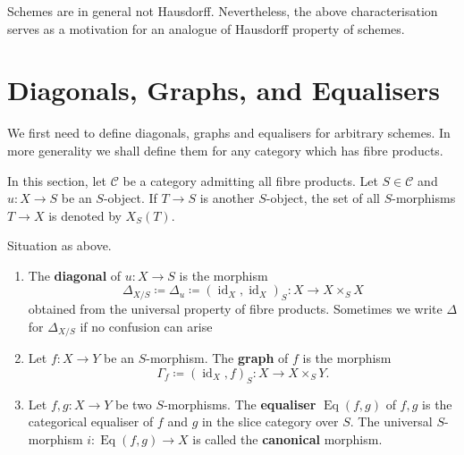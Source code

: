 \documentclass[12pt]{book}
\newcommand{\inlinedef}[1]{\textcolor{oxfordblue}{\bfseries #1}}
\theoremstyle{definition}
\newcommand{\id}{\operatorname{id}}
\newcommand{\Eqlsr}{\operatorname{Eq}}
\begin{document}
	Schemes are in general not Hausdorff. Nevertheless, the above characterisation serves as a motivation for an analogue of Hausdorff property of schemes.
	
	\section{Diagonals, Graphs, and Equalisers}
	
	We first need to define diagonals, graphs and equalisers for arbitrary schemes. In more generality we shall define them for any category which has fibre products.
	
	In this section, let $\mathcal{C}$ be a category admitting all fibre products. Let $S \in \mathcal{C}$ and $u \colon X \to S$ be an $S$-object. If $T \to S$ is another $S$-object, the set of all $S$-morphisms $T \to X$ is denoted by $X_S(T)$.
	
	\begin{definition} Situation as above.
	\begin{enumerate}		\item The \inlinedef{diagonal} of $u\colon X \to S$ is the morphism
		\begin{equation*}
			\Delta_{X/S} \coloneqq \Delta_u \coloneqq (\id_X, \id_X)_S \colon X \to X \times_S X
		\end{equation*}
		obtained from the universal property of fibre products. Sometimes we write $\Delta$ for $\Delta_{X/S}$ if no confusion can arise
		
		\item Let $f \colon X \to Y$ be an $S$-morphism. The \inlinedef{graph} of $f$ is the morphism
		\begin{equation*}
			\Gamma_f \coloneqq (\id_X, f)_S \colon X \to X \times_S Y.
		\end{equation*}
		
		\item Let $f, g \colon X \to Y$ be two $S$-morphisms. The \inlinedef{equaliser} $\Eqlsr(f, g)$ of $f, g$ is the categorical equaliser of $f$ and $g$ in the slice category over $S$. The universal $S$-morphism $i\colon \Eqlsr(f, g) \to X$ is called the \inlinedef{canonical} morphism.
	\end{enumerate}
	\end{definition}
	
\end{document}
